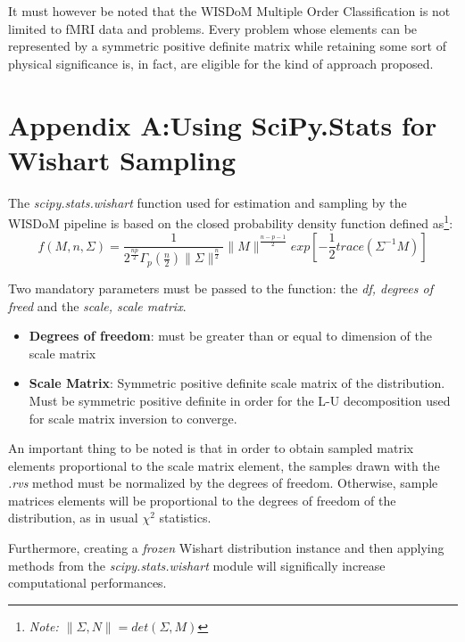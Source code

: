 \documentclass[12pt,openright,twoside,a4paper]{book}
\begin{document}
It must however be noted that the WISDoM Multiple Order Classification is not limited to fMRI data and problems.
Every problem whose elements can be represented by a symmetric positive definite matrix while retaining some sort of physical significance is, in fact, are eligible for the kind of approach proposed.

\appendix

\chapter{Appendix A:Using SciPy.Stats for Wishart Sampling}

The \textit{scipy.stats.wishart} function used for estimation and sampling by the WISDoM pipeline is based on the closed probability density function defined as\footnote{\textit{Note: $\|\Sigma , N \| = det (\Sigma , M)$}}:
\begin{equation}
f(M, n, \Sigma)=\frac{1}{2^{\frac{np}{2}}\Gamma_p(\frac{n}{2})\|\Sigma\|^{\frac{n}{2}}}\|M\|^{\frac{n-p-1}{2}}exp[-\frac{1}{2}trace(\Sigma^{-1}M)]
\end{equation} 

Two mandatory parameters must be passed to the function: the \textit{df, degrees of freed} and the \textit{scale, scale matrix}.
\begin{itemize}
\item \textbf{Degrees of freedom}: must be greater than or equal to dimension of the scale matrix
\item
\textbf{Scale Matrix}: Symmetric positive definite scale matrix of the distribution. Must be symmetric positive definite in order for the L-U decomposition used for scale matrix inversion to converge.
\end{itemize}

An important thing to be noted is that in order to obtain sampled matrix elements proportional to the scale matrix element, the samples drawn with the \textit{.rvs} method must be normalized by the degrees of freedom. Otherwise, sample matrices elements will be proportional to the degrees of freedom of the distribution, as in usual $\chi^2$ statistics.

Furthermore, creating a \textit{frozen} Wishart distribution instance and then applying methods from the \textit{scipy.stats.wishart} module will significally increase computational performances.
\end{document}

